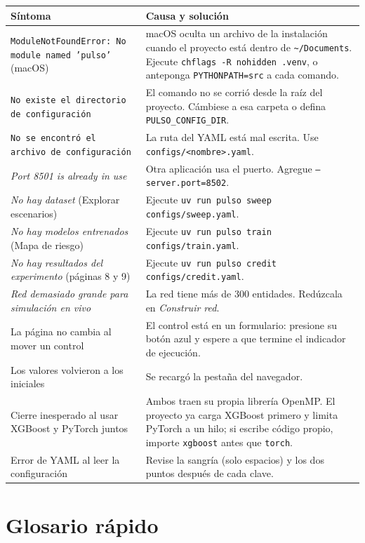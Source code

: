 \begin{longtable}{L{0.38\textwidth}L{0.56\textwidth}}
\toprule
\textbf{Síntoma} & \textbf{Causa y solución} \\
\midrule
\endhead
\texttt{ModuleNotFoundError: No module named 'pulso'} (macOS) & macOS oculta un archivo
de la instalación cuando el proyecto está dentro de \texttt{\textasciitilde/Documents}.
Ejecute \texttt{chflags -R nohidden .venv}, o anteponga \texttt{PYTHONPATH=src} a cada
comando. \\
\texttt{No existe el directorio de configuración} & El comando no se corrió desde la raíz
del proyecto. Cámbiese a esa carpeta o defina \texttt{PULSO\_CONFIG\_DIR}. \\
\texttt{No se encontró el archivo de configuración} & La ruta del YAML está mal escrita.
Use \texttt{configs/<nombre>.yaml}. \\
\emph{Port 8501 is already in use} & Otra aplicación usa el puerto. Agregue
\texttt{--server.port=8502}. \\
\emph{No hay dataset} (Explorar escenarios) & Ejecute \texttt{uv run pulso sweep
configs/sweep.yaml}. \\
\emph{No hay modelos entrenados} (Mapa de riesgo) & Ejecute \texttt{uv run pulso train
configs/train.yaml}. \\
\emph{No hay resultados del experimento} (páginas 8 y 9) & Ejecute \texttt{uv run pulso
credit configs/credit.yaml}. \\
\emph{Red demasiado grande para simulación en vivo} & La red tiene más de 300 entidades.
Redúzcala en \emph{Construir red}. \\
La página no cambia al mover un control & El control está en un formulario: presione su
botón azul y espere a que termine el indicador de ejecución. \\
Los valores volvieron a los iniciales & Se recargó la pestaña del navegador. \\
Cierre inesperado al usar XGBoost y PyTorch juntos & Ambos traen su propia librería
OpenMP. El proyecto ya carga XGBoost primero y limita PyTorch a un hilo; si escribe código
propio, importe \texttt{xgboost} antes que \texttt{torch}. \\
Error de YAML al leer la configuración & Revise la sangría (solo espacios) y los dos
puntos después de cada clave. \\
\bottomrule
\end{longtable}

\chapter{Glosario rápido}

